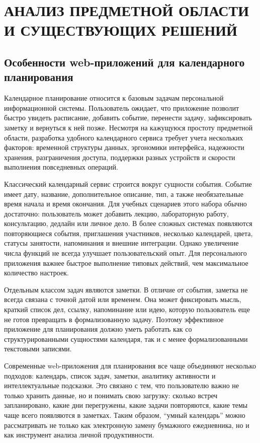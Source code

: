 \documentclass[14pt,a4paper]{extreport}
\begin{document}
\chapter{АНАЛИЗ ПРЕДМЕТНОЙ ОБЛАСТИ И СУЩЕСТВУЮЩИХ РЕШЕНИЙ}

\section{Особенности web-приложений для календарного планирования}

Календарное планирование относится к базовым задачам персональной информационной системы. Пользователь ожидает, что приложение позволит быстро увидеть расписание, добавить событие, перенести задачу, зафиксировать заметку и вернуться к ней позже. Несмотря на кажущуюся простоту предметной области, разработка удобного календарного сервиса требует учета нескольких факторов: временной структуры данных, эргономики интерфейса, надежности хранения, разграничения доступа, поддержки разных устройств и скорости выполнения повседневных операций.

Классический календарный сервис строится вокруг сущности события. Событие имеет дату, название, дополнительное описание, тип, а также необязательные время начала и время окончания. Для учебных сценариев этого набора обычно достаточно: пользователь может добавить лекцию, лабораторную работу, консультацию, дедлайн или личное дело. В более сложных системах появляются повторяющиеся события, приглашения участников, несколько календарей, цвета, статусы занятости, напоминания и внешние интеграции. Однако увеличение числа функций не всегда улучшает пользовательский опыт. Для персонального приложения важнее быстрое выполнение типовых действий, чем максимальное количество настроек.

Отдельным классом задач являются заметки. В отличие от события, заметка не всегда связана с точной датой или временем. Она может фиксировать мысль, краткий список дел, ссылку, напоминание или идею, которую пользователь еще не готов превращать в формализованную задачу. Поэтому эффективное приложение для планирования должно уметь работать как со структурированными сущностями календаря, так и с менее формализованными текстовыми записями.

Современные web-приложения для планирования все чаще объединяют несколько подходов: календарь, список задач, заметки, аналитику активности и интеллектуальные подсказки. Это связано с тем, что пользователю важно не только хранить данные, но и понимать свою загрузку: сколько встреч запланировано, какие дни перегружены, какие задачи повторяются, какие темы чаще всего появляются в заметках. Таким образом, ``умный календарь'' можно рассматривать не только как электронную замену бумажного ежедневника, но и как инструмент анализа личной продуктивности.
\end{document}
